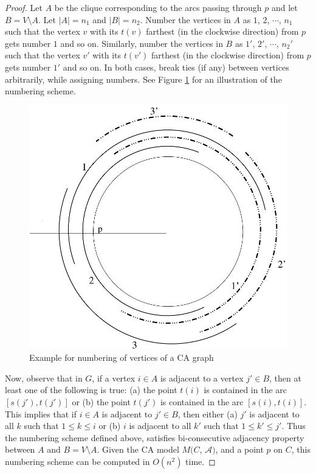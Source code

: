\begin{proof}
 Let $A$ be the clique corresponding to the arcs passing through $p$ and let $B = V \setminus A$. Let $|A| = n_1$ and $|B| = n_2$. Number the vertices in $A$ as $1$, $2$, $\cdots$, $n_1$ such that the vertex $v$ with its $t(v)$ farthest (in the clockwise direction) from $p$  gets number $1$ and so on. Similarly, number the vertices in $B$ as  $1'$, $2'$, $\cdots$, $n_2'$ such that the vertex $v'$ with its $t(v')$ farthest (in the clockwise direction) from $p$  gets number $1'$ and so on. In both cases, break ties (if any) between vertices arbitrarily, while assigning numbers. See Figure \ref{Fig1} for an illustration of the numbering scheme.
\begin{figure} 
\begin{center}
\includegraphics[scale=0.4]{gfx/ARCS_NUM}
\caption{Example for numbering of vertices of a CA graph}
\label{Fig1}
\end{center}
\end{figure}
Now, observe that in $G$, if a vertex $i \in A$ is adjacent to a vertex $j' \in B$, then at least one of the following is true: 
(a) the point $t(i)$ is contained in the arc $[s(j'), t(j')]$ or (b) the point $t(j')$ is contained in the arc $[s(i), t(i)]$. This implies that if $i \in A$ is adjacent to $j' \in B$, then  either (a) $j'$ is adjacent to all $k$ such that $1\le k \le i$  or (b) $i$ is adjacent to all $k'$ such that $1\le k' \le j'$. Thus the numbering scheme defined above, satisfies bi-consecutive adjacency property between $A$ and $B=V \setminus A$. Given the CA model $M(C$, $\mathcal{A})$, and a point $p$ on $C$, this numbering scheme can be computed in $O(n^2)$ time.
\end{proof}
